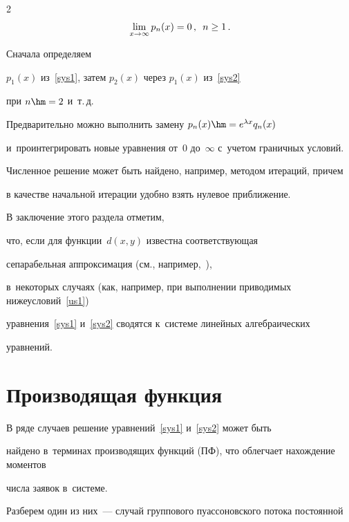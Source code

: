 \begin{multicols}{2}
$$


\lim\limits_{x\to \infty} p_{n}(x)= 0\,,\enskip


n\ge 1\,.


$$





 Сначала определяем


$p_1(x)$ из~\eqref{sys1}, затем $p_2(x)$ через $p_1(x)$ из~\eqref{sys2} 


при $n\hm=2$ и~т.\,д.


Предварительно можно выполнить замену \mbox{$p_n(x) \hm= e^{\lambda x} q_n(x)$}


и~проинтегрировать новые уравнения от~0 до~$\infty$ с~учетом граничных условий.


Чис\-лен\-ное решение может быть найдено, например, методом итераций, причем


в качестве начальной итерации удобно взять нулевое приближение.





В заключение этого раздела отметим,


что, если для функции~$d(x,y)$ известна соответству\-ющая


сепарабельная аппроксимация (см., например,~\cite{n5,n6,n7,n8}), 


в~некоторых случаях (как, например, при выполнении приводимых ниже\linebreak условий~\eqref{us1})


уравнения~\eqref{sys1} и~\eqref{sys2} сводятся к~сис\-те\-ме линейных алгебраических 


уравнений.





\section{Производящая функция}





В ряде случаев решение уравнений~\eqref{sys1} и~\eqref{sys2} может быть


найдено в~терминах производящих функций (ПФ), что облегчает нахождение моментов\linebreak


чис\-ла заявок в~сис\-те\-ме.


Разберем один из них~--- случай группового пуассоновского потока постоянной



\end{multicols}
